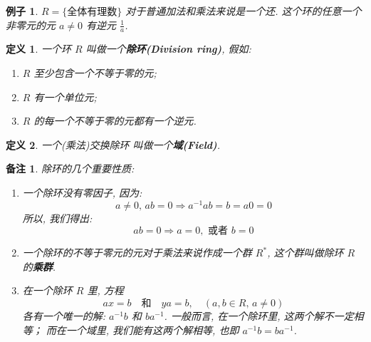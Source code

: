 \documentclass[utf8]{ctexbook}
\newtheorem{definition}{定义}[section]
\newtheorem{memo}{备注}[section]
\newtheorem{example}{例子}[section]
\begin{document}
\begin{example}
$R = \{ \mbox{全体有理数} \} $ 对于普通加法和乘法来说是一个还. 这个环的任意一个非零元的元 $a \neq 0$ 有逆元 $\frac{1}{a}$.
\end{example}

\begin{definition}
一个环 $R$ 叫做一个\textbf{除环(Division ring)}, 假如:
\begin{enumerate}
\item{$R$ 至少包含一个不等于零的元;}
\item{$R$ 有一个单位元;}
\item{$R$ 的每一个不等于零的元都有一个逆元.}
\end{enumerate}
\end{definition}

\begin{definition}
一个(乘法)交换除环 叫做一个\textbf{域(Field)}.
\end{definition}

\begin{memo}\label{memo_division_ring_properties}
除环的几个重要性质:

\begin{enumerate}
\item{一个除环没有零因子, 因为:
\begin{equation}
a \neq 0, \, ab = 0 \Rightarrow a^{-1} ab = b = a0 = 0
\end{equation}
所以, 我们得出:
\begin{equation}
ab = 0 \Rightarrow a = 0, \mbox{  或者  } b = 0
\end{equation}
}
\item{一个除环的不等于零元的元对于乘法来说作成一个群 $R^*$, 这个群叫做除环 $R$ 的\textbf{乘群}.}
\item{在一个除环 $R$ 里, 方程
\begin{equation}
ax = b \quad \mbox{和} \quad ya = b, \quad (a, b \in R,\, a \neq 0 )
\end{equation}
各有一个唯一的解: $a^{-1}b$ 和 $b a^{-1}$. 一般而言, 在一个除环里, 这两个解不一定相等； 而在一个域里, 我们能有这两个解相等, 也即 $a^{-1}b = b a^{-1}$.
}

\end{enumerate}
\end{memo}
\end{document}

